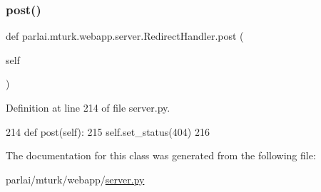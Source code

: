 \subsubsection{\texorpdfstring{post()}{post()}}
{\footnotesize\ttfamily def parlai.\+mturk.\+webapp.\+server.\+Redirect\+Handler.\+post (\begin{DoxyParamCaption}\item[{}]{self }\end{DoxyParamCaption})}



Definition at line 214 of file server.\+py.


\begin{DoxyCode}
214     \textcolor{keyword}{def }post(self):
215         self.set\_status(404)
216 
\end{DoxyCode}


The documentation for this class was generated from the following file\+:\begin{DoxyCompactItemize}
\item 
parlai/mturk/webapp/\hyperlink{server_8py}{server.\+py}\end{DoxyCompactItemize}
